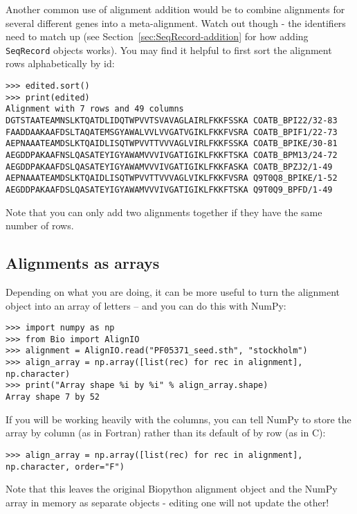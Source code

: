 Another common use of alignment addition would be to combine alignments for
several different genes into a meta-alignment. Watch out though - the identifiers
need to match up (see Section~\ref{sec:SeqRecord-addition} for how adding
\verb|SeqRecord| objects works). You may find it helpful to first sort the
alignment rows alphabetically by id:

\begin{verbatim}
>>> edited.sort()
>>> print(edited)
Alignment with 7 rows and 49 columns
DGTSTAATEAMNSLKTQATDLIDQTWPVVTSVAVAGLAIRLFKKFSSKA COATB_BPI22/32-83
FAADDAAKAAFDSLTAQATEMSGYAWALVVLVVGATVGIKLFKKFVSRA COATB_BPIF1/22-73
AEPNAAATEAMDSLKTQAIDLISQTWPVVTTVVVAGLVIRLFKKFSSKA COATB_BPIKE/30-81
AEGDDPAKAAFNSLQASATEYIGYAWAMVVVIVGATIGIKLFKKFTSKA COATB_BPM13/24-72
AEGDDPAKAAFDSLQASATEYIGYAWAMVVVIVGATIGIKLFKKFASKA COATB_BPZJ2/1-49
AEPNAAATEAMDSLKTQAIDLISQTWPVVTTVVVAGLVIKLFKKFVSRA Q9T0Q8_BPIKE/1-52
AEGDDPAKAAFDSLQASATEYIGYAWAMVVVIVGATIGIKLFKKFTSKA Q9T0Q9_BPFD/1-49
\end{verbatim}

\noindent Note that you can only add two alignments together if they
have the same number of rows.

\subsection{Alignments as arrays}
Depending on what you are doing, it can be more useful to turn the alignment
object into an array of letters -- and you can do this with NumPy:

\begin{verbatim}
>>> import numpy as np
>>> from Bio import AlignIO
>>> alignment = AlignIO.read("PF05371_seed.sth", "stockholm")
>>> align_array = np.array([list(rec) for rec in alignment], np.character)
>>> print("Array shape %i by %i" % align_array.shape)
Array shape 7 by 52
\end{verbatim}

If you will be working heavily with the columns, you can tell NumPy to store
the array by column (as in Fortran) rather than its default of by row (as in C):

\begin{verbatim}
>>> align_array = np.array([list(rec) for rec in alignment], np.character, order="F")
\end{verbatim}

Note that this leaves the original Biopython alignment object and the NumPy array
in memory as separate objects - editing one will not update the other!

